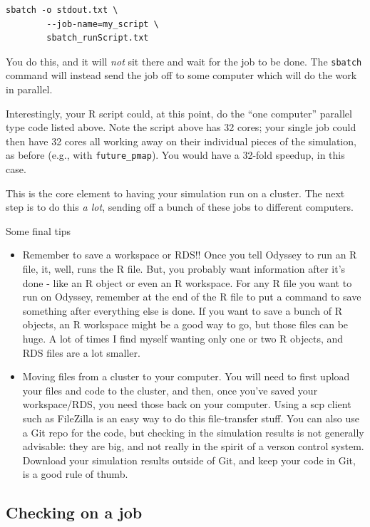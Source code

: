 \documentclass[
]{book}
\begin{document}
\begin{verbatim}
sbatch -o stdout.txt \
        --job-name=my_script \
        sbatch_runScript.txt
\end{verbatim}

You do this, and it will \emph{not} sit there and wait for the job to be done.
The \texttt{sbatch} command will instead send the job off to some computer which will do the work in parallel.

Interestingly, your R script could, at this point, do the ``one computer'' parallel type code listed above.
Note the script above has 32 cores; your single job could then have 32 cores all working away on their individual pieces of the simulation, as before (e.g., with \texttt{future\_pmap}).
You would have a 32-fold speedup, in this case.

This is the core element to having your simulation run on a cluster.
The next step is to do this \emph{a lot}, sending off a bunch of these jobs to different computers.

Some final tips

\begin{itemize}
\item
  Remember to save a workspace or RDS!! Once you tell Odyssey to run an R file, it, well, runs the R file. But, you probably want information after it's done - like an R object or even an R workspace. For any R file you want to run on Odyssey, remember at the end of the R file to put a command to save something after everything else is done. If you want to save a bunch of R objects, an R workspace might be a good way to go, but those files can be huge. A lot of times I find myself wanting only one or two R objects, and RDS files are a lot smaller.
\item
  Moving files from a cluster to your computer. You will need to first upload your files and code to the cluster, and then, once you've saved your workspace/RDS, you need those back on your computer. Using a scp client such as FileZilla is an easy way to do this file-transfer stuff. You can also use a Git repo for the code, but checking in the simulation results is not generally advisable: they are big, and not really in the spirit of a verson control system. Download your simulation results outside of Git, and keep your code in Git, is a good rule of thumb.
\end{itemize}

\subsection{Checking on a job}\label{checking-on-a-job}
\end{document}
